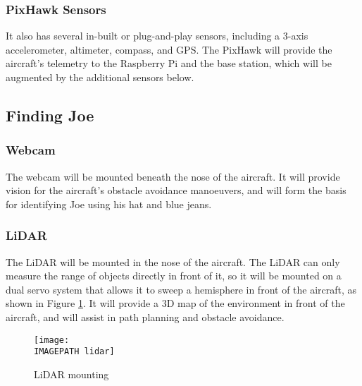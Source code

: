 \subsubsection*{PixHawk Sensors}
It also has several in-built or plug-and-play sensors, including a 3-axis accelerometer, altimeter, compass, and GPS. The PixHawk will provide the aircraft's telemetry to the Raspberry Pi and the base station, which will be augmented by the additional sensors below.

\subsection{Finding Joe}
\subsubsection*{Webcam}
The webcam will be mounted beneath the nose of the aircraft. It will provide vision for the aircraft's obstacle avoidance manoeuvers, and will form the basis for identifying Joe using his hat and blue jeans.

\subsubsection*{LiDAR}
The LiDAR will be mounted in the nose of the aircraft. The LiDAR can only measure the range of objects directly in front of it, so it will be mounted on a dual servo system that allows it to sweep a hemisphere in front of the aircraft, as shown in Figure \ref{fig:lidar}. It will provide a 3D map of the environment in front of the aircraft, and will assist in path planning and obstacle avoidance.

\begin{figure}[!ht]
	\centering
	\texttt{[image: \\IMAGEPATH lidar]}
	\caption{LiDAR mounting}
	\label{fig:lidar}
\end{figure}